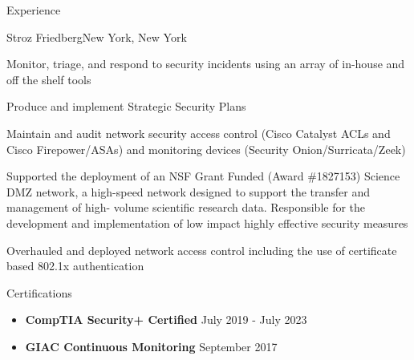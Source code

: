 \documentclass[]{mcdowellcv}
\begin{document}
\begin{cvsection}{Experience}
\begin{jobentry}{Stroz Friedberg}{New York, New York}
        
        \begin{jobresponsibilities}
            \item Monitor, triage, and respond to security incidents using an array of in-house and off the
    shelf tools
            \item Produce and implement Strategic Security Plans
            \item Maintain and audit network security access control (Cisco Catalyst ACLs and Cisco
    Firepower/ASAs) and monitoring devices (Security Onion/Surricata/Zeek)
        \end{jobresponsibilities}
        
        \begin{jobprojects}
            \item Supported the deployment of an NSF Grant Funded (Award \#1827153) Science DMZ
    network, a high-speed network designed to support the transfer and management of high-
    volume scientific research data. Responsible for the development and implementation of
    low impact highly effective security measures
            \item Overhauled and deployed network access control including the use of certificate based
    802.1x authentication
        \end{jobprojects}
    \end{jobentry}

\end{cvsection}


\begin{cvsection}{Certifications}
	\begin{cvsubsection}{}{}{}
		\begin{itemize}
			\setlength\itemsep{3pt}
			\item \textbf{CompTIA Security+ Certified} \hfill July 2019 - July 2023
			\item \textbf{GIAC Continuous Monitoring} \hfill September 2017
		\end{itemize}
	\end{cvsubsection}
\end{cvsection}
\end{document}
